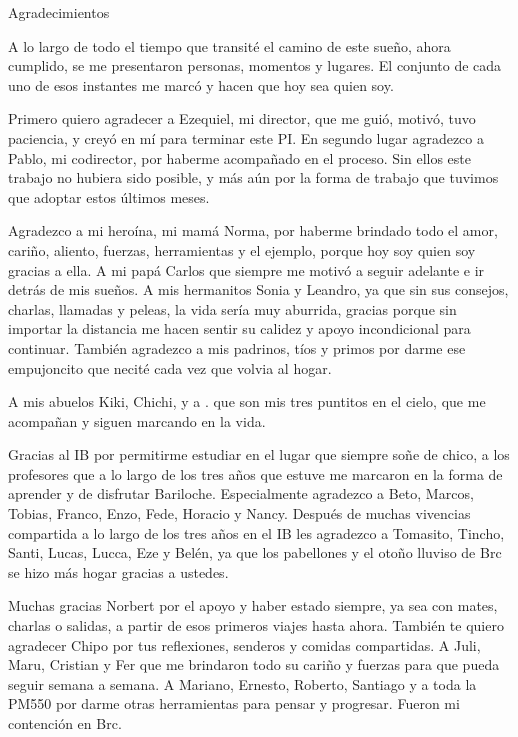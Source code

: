 \documentclass[12pt,papel,oneside]{ibtesis}
\begin{document}
\begin{postliminary}

\listoffigures                  %

\listoftables                   %






\begin{seccion}{Agradecimientos}
\begin{footnotesize}		
A lo largo de todo el tiempo que transité el camino de este sueño, ahora cumplido, se me presentaron personas, momentos y lugares. El conjunto de cada uno de esos instantes me marcó y hacen que hoy sea quien soy.

Primero quiero agradecer a Ezequiel, mi director, que me guió, motivó, tuvo paciencia, y creyó en mí para terminar este PI. En segundo lugar agradezco a Pablo, mi codirector, por haberme acompañado en el proceso. Sin ellos este trabajo no hubiera sido posible, y más aún por la forma de trabajo que tuvimos que adoptar estos últimos meses.

Agradezco a mi heroína, mi mamá Norma, por haberme brindado todo el amor, cariño, aliento, fuerzas, herramientas y el ejemplo, porque  hoy soy quien soy gracias a ella. A mi papá Carlos que siempre me motivó a seguir adelante e ir detrás de mis sueños. A mis hermanitos Sonia y Leandro, ya que sin sus consejos, charlas, llamadas y peleas, la vida sería muy aburrida, gracias porque sin importar la distancia me hacen sentir su calidez y apoyo incondicional para continuar. También agradezco a mis padrinos, tíos y primos por darme ese empujoncito que necité cada vez que volvia al hogar.

A mis abuelos Kiki, Chichi, y a . que son mis tres puntitos en el cielo, que me acompañan y siguen marcando en la vida.

Gracias al IB por permitirme estudiar en el lugar que siempre soñe de chico, a los profesores que a lo largo de los tres años que estuve me marcaron en la forma de aprender y de disfrutar Bariloche. Especialmente agradezco a Beto, Marcos, Tobias, Franco, Enzo, Fede, Horacio y Nancy. Después de muchas vivencias compartida a lo largo de los tres años en el IB les agradezco a Tomasito, Tincho, Santi, Lucas, Lucca, Eze y Belén, ya que los pabellones y el otoño lluviso de Brc se hizo más hogar gracias a ustedes. 

Muchas gracias Norbert por el apoyo y haber estado siempre, ya sea con mates, charlas o salidas, a partir de esos primeros viajes hasta ahora. También te quiero agradecer Chipo por tus reflexiones, senderos y comidas compartidas. A Juli, Maru, Cristian y Fer que me brindaron todo su cariño y fuerzas para que pueda seguir semana a semana. A Mariano, Ernesto, Roberto, Santiago y a toda la PM550 por darme otras herramientas para pensar y progresar. Fueron mi contención en Brc.


\end{footnotesize}
\end{seccion}
\end{postliminary}
\end{document}
